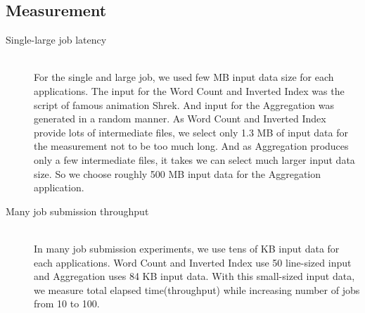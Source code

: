 \documentclass[nocopyrightspace]{sigplanconf}
\begin{document}
\subsection*{Measurement}

\begin{description}


\item[Single-large job latency] \hfill \\
For the single and large job, we used few MB input data size for each applications. 
The input for the Word Count and Inverted Index was the script of famous animation Shrek. 
And input for the Aggregation was generated in a random manner. As Word Count and Inverted 
Index provide lots of intermediate files, we select only 1.3 MB of input data for the measurement 
not to be too much long. And as Aggregation produces only a few intermediate files, it takes we can 
select much larger input data size. So we choose roughly 500 MB input data for the Aggregation application.


\item[Many job submission throughput] \hfill \\
In many job submission experiments, we use tens of KB input data for each applications. 
Word Count and Inverted Index use 50 line-sized input and Aggregation uses 84 KB input 
data. With this small-sized input data, we measure total elapsed time(throughput) while 
increasing number of jobs from 10 to 100.

\end{description}
\end{document}

